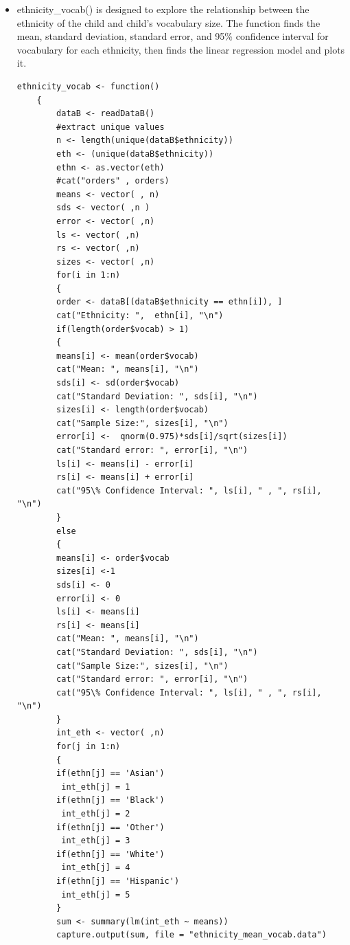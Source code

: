 \documentclass[11pt]{article}  %
\begin{document}
\begin{itemize}
\begin{lstlisting}[basicstyle=\small]
        means_order <- ggplot() + aes(x = births, y = means) 
            + geom_point(shape = 1) + geom_smooth(method = lm, se=TRUE)
            + labs(title = "Linear Model for Birth Order
                and Average Vocabulary",
            x = "Birth Order as Integer", y = "Average Vocabulary")
        ggsave(means_order, file="means_orders.png")
    }
    \end{lstlisting}
    
    \label{sec:EV}
    \item ethnicity\_vocab() is designed to explore the relationship between the ethnicity of the child and child's vocabulary size. The function finds the mean, standard deviation, standard error, and 95\% confidence interval for vocabulary for each ethnicity, then finds the linear regression model and plots it.
    \begin{lstlisting}[basicstyle=\small]
    ethnicity_vocab <- function()
    {
        dataB <- readDataB()
        #extract unique values
        n <- length(unique(dataB$ethnicity))
        eth <- (unique(dataB$ethnicity))
        ethn <- as.vector(eth)
        #cat("orders" , orders)
        means <- vector( , n)
        sds <- vector( ,n )
        error <- vector( ,n)
        ls <- vector( ,n)
        rs <- vector( ,n)
        sizes <- vector( ,n)
        for(i in 1:n)
        {
        order <- dataB[(dataB$ethnicity == ethn[i]), ]
        cat("Ethnicity: ",  ethn[i], "\n")
        if(length(order$vocab) > 1)
        {
        means[i] <- mean(order$vocab)
        cat("Mean: ", means[i], "\n")
        sds[i] <- sd(order$vocab)
        cat("Standard Deviation: ", sds[i], "\n")
        sizes[i] <- length(order$vocab)
        cat("Sample Size:", sizes[i], "\n")
        error[i] <-  qnorm(0.975)*sds[i]/sqrt(sizes[i])
        cat("Standard error: ", error[i], "\n")
        ls[i] <- means[i] - error[i]
        rs[i] <- means[i] + error[i]
        cat("95\% Confidence Interval: ", ls[i], " , ", rs[i], "\n")
        }
        else
        {
        means[i] <- order$vocab
        sizes[i] <-1
        sds[i] <- 0
        error[i] <- 0
        ls[i] <- means[i]
        rs[i] <- means[i]
        cat("Mean: ", means[i], "\n")
        cat("Standard Deviation: ", sds[i], "\n")
        cat("Sample Size:", sizes[i], "\n")
        cat("Standard error: ", error[i], "\n")
        cat("95\% Confidence Interval: ", ls[i], " , ", rs[i], "\n")
        }
        int_eth <- vector( ,n)
        for(j in 1:n)
        {
        if(ethn[j] == 'Asian')
         int_eth[j] = 1
        if(ethn[j] == 'Black')
         int_eth[j] = 2
        if(ethn[j] == 'Other')
         int_eth[j] = 3
        if(ethn[j] == 'White')
         int_eth[j] = 4
        if(ethn[j] == 'Hispanic')
         int_eth[j] = 5
        }
        sum <- summary(lm(int_eth ~ means))
        capture.output(sum, file = "ethnicity_mean_vocab.data")
        

\end{lstlisting}
\end{itemize}
\end{document}
